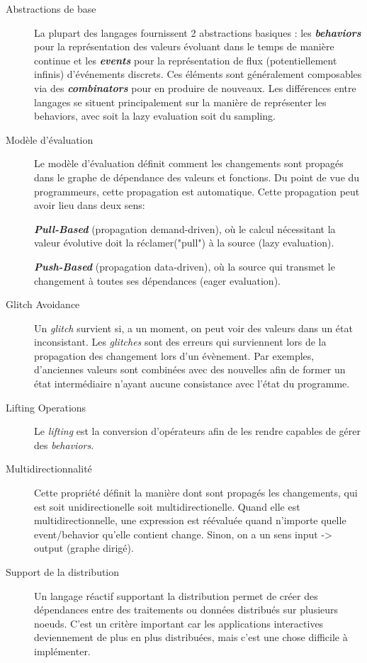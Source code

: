 \documentclass[10pt,final]{IEEEtran}
\begin{document}
\begin{description}
    \item[Abstractions de base]
    La plupart des langages fournissent 2 abstractions basiques : les \textbf{\textit{behaviors}} pour la représentation des valeurs évoluant dans le temps de manière continue et les \textbf{\textit{events}} pour la représentation de flux (potentiellement infinis) d'événements discrets. Ces éléments sont généralement composables via des \textbf{\textit{combinators}} pour en produire de nouveaux. Les différences entre langages se situent principalement sur la manière de représenter les behaviors, avec soit la lazy evaluation soit du sampling.
    
    \item[Modèle d'évaluation]
    Le modèle d'évaluation définit comment les changements sont propagés dans le graphe de dépendance des valeurs et fonctions. Du point de vue du programmeurs, cette propagation est automatique. Cette propagation peut avoir lieu dans deux sens: 
    
    \textbf{\textit{Pull-Based}} (propagation demand-driven), où le calcul nécessitant la valeur évolutive doit la réclamer("pull") à la source (lazy evaluation).
    
    \textbf{\textit{Push-Based}} (propagation data-driven), où la source qui transmet le changement à toutes ses dépendances (eager evaluation).
    
    \item[Glitch Avoidance]
    Un \textit{glitch} survient si, a un moment, on peut voir des valeurs dans un état inconsistant. Les \textit{glitches} sont des erreurs qui surviennent lors de la propagation des changement lors d'un évènement. Par exemples, d'anciennes valeurs sont combinées avec des nouvelles afin de former un état intermédiaire n'ayant aucune consistance avec l'état du programme.
    
    \item[Lifting Operations]
    Le \textit{lifting} est la conversion d'opérateurs afin de les rendre capables de gérer des \textit{behaviors}.
    
    \item[Multidirectionnalité]
    Cette propriété définit la manière dont sont propagés les changements, qui est soit unidirectionelle soit multidirectionelle. Quand elle est multidirectionnelle, une expression est réévaluée quand n'importe quelle event/behavior qu'elle contient change. Sinon, on a un sens input -> output (graphe dirigé).
    
    \item[Support de la distribution]
    Un langage réactif supportant la distribution permet de créer des dépendances entre des traitements ou données distribués sur plusieurs noeuds. C'est un critère important car les applications interactives deviennement de plus en plus distribuées, mais c'est une chose difficile à implémenter.
\end{description}
\end{document}
